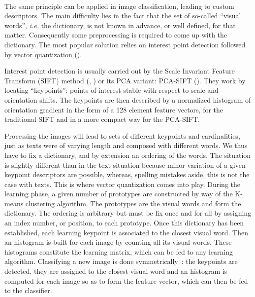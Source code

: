 \documentclass[a4paper]{report}
\begin{document}
\paragraph{}
The same principle can be applied in image classification, leading to custom descriptors. The main difficulty lies in the fact that the set of so-called ``visual words'', \textit{i.e.} the dictionary, is not known in advance, or well defined, for that matter. Consequently some preprocessing is required to come up with the dictionary. The most popular solution relies on interest point detection followed by vector quantization (\cite{BagOfWords}). 
\par
Interest point detection is usually carried out by the Scale Invariant Feature Transform (SIFT) method (\cite{SIFT}, \cite{SIFTExplained}) or its PCA variant: PCA-SIFT (\cite{PCASIFT}). They work by locating ``keypoints'': points of interest stable with respect to scale and orientation shifts. The keypoints are then described by a normalized histogram of orientation gradient in the form of a 128 element feature vectors, for the traditional SIFT and in a more compact way for the PCA-SIFT.
\par
Processing the images will lead to sets of different keypoints and cardinalities, just as texts were of varying length and composed with different words. We thus have to fix a dictionary, and by extension an ordering of the words. The situation is slightly different than in the text situation because minor variation of a given keypoint descriptors are possible, whereas, spelling mistakes aside, this is not the case with texts. This is where vector quantization comes into play. During the learning phase, a given number of prototypes are constructed by way of the K-means clustering algorithm. The prototypes are the visual words and form the dictionary. The ordering is arbitrary but must be fix once and for all by assigning an index number, or position, to each prototype. Once this dictionary has been established, each learning keypoint is associated to the closest visual word. Then an histogram is built for each image by counting all its visual words. These histograms constitute the learning matrix, which can be fed to any learning algorithm. Classifying a new image is done symmetrically~: the keypoints are detected, they are assigned to the closest visual word and an histogram is computed for each image so as to form the feature vector, which can then be fed to the classifier.
\end{document}
